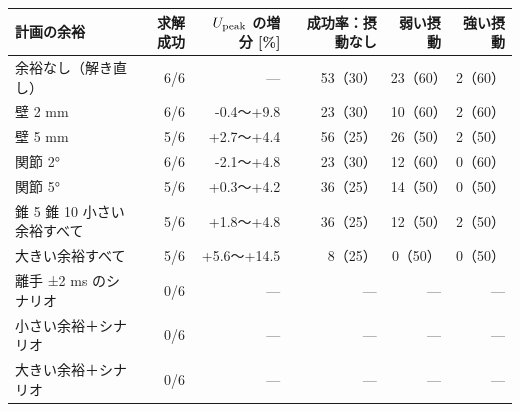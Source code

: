 \begin{tabular}{lrrrrr}
\toprule
計画の余裕 & 求解成功 & $U_{\mathrm{peak}}$ の増分 [\%] & 成功率：摂動なし & 弱い摂動 & 強い摂動 \\
\midrule
余裕なし（解き直し） & 6/6 & --- & 53（30） & 23（60） & 2（60） \\
壁 2 mm & 6/6 & -0.4〜+9.8 & 23（30） & 10（60） & 2（60） \\
壁 5 mm & 5/6 & +2.7〜+4.4 & 56（25） & 26（50） & 2（50） \\
関節 2° & 6/6 & -2.1〜+4.8 & 23（30） & 12（60） & 0（60） \\
関節 5° & 5/6 & +0.3〜+4.2 & 36（25） & 14（50） & 0（50） \\
錐 5%
錐 10%
小さい余裕すべて & 5/6 & +1.8〜+4.8 & 36（25） & 12（50） & 2（50） \\
大きい余裕すべて & 5/6 & +5.6〜+14.5 & 8（25） & 0（50） & 0（50） \\
離手 ±2 ms のシナリオ & 0/6 & --- & --- & --- & --- \\
小さい余裕＋シナリオ & 0/6 & --- & --- & --- & --- \\
大きい余裕＋シナリオ & 0/6 & --- & --- & --- & --- \\
\bottomrule
\end{tabular}
